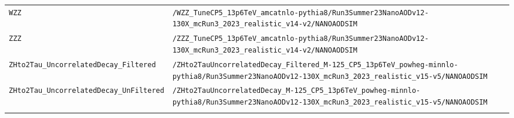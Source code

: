 \begin{longtable}{@{}>{\RaggedRight\arraybackslash}p{} >{\RaggedRight\arraybackslash}p{}@{}}
\addlinespace[2pt]
\texttt{WZZ} & \texttt{/\allowbreak{}WZZ\_\allowbreak{}TuneCP5\_\allowbreak{}13p6TeV\_\allowbreak{}amcatnlo-\allowbreak{}pythia8/\allowbreak{}Run3Summer23NanoAODv12-\allowbreak{}130X\_\allowbreak{}mcRun3\_\allowbreak{}2023\_\allowbreak{}realistic\_\allowbreak{}v14-\allowbreak{}v2/\allowbreak{}NANOAODSIM} \\
\addlinespace[2pt]
\texttt{ZZZ} & \texttt{/\allowbreak{}ZZZ\_\allowbreak{}TuneCP5\_\allowbreak{}13p6TeV\_\allowbreak{}amcatnlo-\allowbreak{}pythia8/\allowbreak{}Run3Summer23NanoAODv12-\allowbreak{}130X\_\allowbreak{}mcRun3\_\allowbreak{}2023\_\allowbreak{}realistic\_\allowbreak{}v14-\allowbreak{}v2/\allowbreak{}NANOAODSIM} \\
\addlinespace[2pt]
\texttt{ZHto2Tau\_\allowbreak{}UncorrelatedDecay\_\allowbreak{}Filtered} & \texttt{/\allowbreak{}ZHto2TauUncorrelatedDecay\_\allowbreak{}Filtered\_\allowbreak{}M-\allowbreak{}125\_\allowbreak{}CP5\_\allowbreak{}13p6TeV\_\allowbreak{}powheg-\allowbreak{}minnlo-\allowbreak{}pythia8/\allowbreak{}Run3Summer23NanoAODv12-\allowbreak{}130X\_\allowbreak{}mcRun3\_\allowbreak{}2023\_\allowbreak{}realistic\_\allowbreak{}v15-\allowbreak{}v5/\allowbreak{}NANOAODSIM} \\
\addlinespace[2pt]
\texttt{ZHto2Tau\_\allowbreak{}UncorrelatedDecay\_\allowbreak{}UnFiltered} & \texttt{/\allowbreak{}ZHto2TauUncorrelatedDecay\_\allowbreak{}M-\allowbreak{}125\_\allowbreak{}CP5\_\allowbreak{}13p6TeV\_\allowbreak{}powheg-\allowbreak{}minnlo-\allowbreak{}pythia8/\allowbreak{}Run3Summer23NanoAODv12-\allowbreak{}130X\_\allowbreak{}mcRun3\_\allowbreak{}2023\_\allowbreak{}realistic\_\allowbreak{}v15-\allowbreak{}v5/\allowbreak{}NANOAODSIM} \\
\addlinespace[2pt]
\end{longtable}
